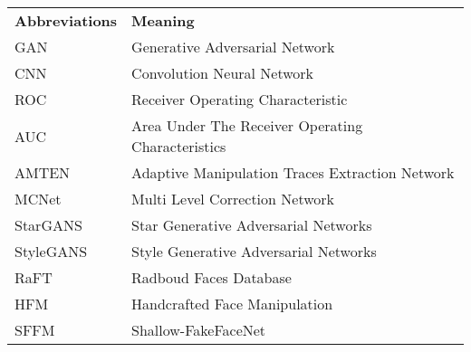 \begin{table}[h]
	\begin{tabular}{l l}
		\textbf{Abbreviations} & \textbf{Meaning}                                   \\
		GAN                    & Generative Adversarial Network                     \\
		CNN	                   & Convolution Neural Network                         \\
		ROC                    & Receiver Operating Characteristic                  \\
		AUC                    & Area Under The Receiver Operating Characteristics  \\
		AMTEN 								 & Adaptive Manipulation Traces Extraction Network    \\ 
		MCNet                  & Multi Level Correction Network 	                  \\
		StarGANS               & Star Generative Adversarial Networks               \\
		StyleGANS              & Style Generative Adversarial Networks              \\
		RaFT                   & Radboud Faces Database                							\\
		HFM 									 & Handcrafted Face Manipulation           						\\
		SFFM									 & Shallow-FakeFaceNet																\\
	\end{tabular}
\end{table}
\pagebreak
